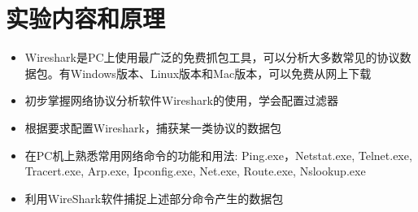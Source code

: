 
\section{实验内容和原理}

\begin{itemize}
    \item Wireshark是PC上使用最广泛的免费抓包工具，可以分析大多数常见的协议数据包。有Windows版本、Linux版本和Mac版本，可以免费从网上下载 
    \item 初步掌握网络协议分析软件Wireshark的使用，学会配置过滤器
    \item 根据要求配置Wireshark，捕获某一类协议的数据包
    \item 在PC机上熟悉常用网络命令的功能和用法: Ping.exe，Netstat.exe, Telnet.exe, Tracert.exe, Arp.exe, Ipconfig.exe, Net.exe, Route.exe, Nslookup.exe
    \item 利用WireShark软件捕捉上述部分命令产生的数据包
\end{itemize}
